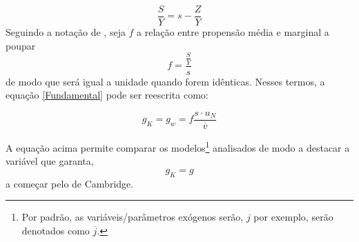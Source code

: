 \begin{equation}
\label{Poupanca_Super}
    \frac{S}{Y} = s - \frac{Z}{Y}
\end{equation}
Seguindo a notação de \textcite{serrano_sraffian_1995}, seja $f$ a relação entre propensão média e marginal a poupar
$$
f = \frac{\frac{S}{Y}}{s}
$$
de modo que será igual a unidade quando forem idênticas. Nesses termos, a equação \ref{Fundamental} pode ser reescrita como:

\begin{equation}
 \label{EqGeral}   
g_K = g_w = f\frac{s\cdot u_N}{\overline v}
\end{equation}

A equação acima permite comparar os modelos\footnote{Por padrão, as variáveis/parâmetros exógenos serão, $j$ por exemplo, serão denotados como $\overline j$.} analisados de modo a destacar a variável que garanta, 
$$
g_K = g
$$
a começar pelo de Cambridge.
